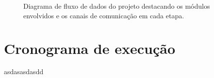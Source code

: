 \documentclass[12pt,consuni]{uftpibic}
\begin{document}
\begin{figure}[!htpb]
\centering
\caption{Diagrama de fluxo de dados do projeto destacando os módulos envolvidos e os canais de comunicação em cada etapa.}
\label{fig:projeto}
\end{figure}

\chapter{Cronograma de execução}

asdasasdasdd


\end{document}
